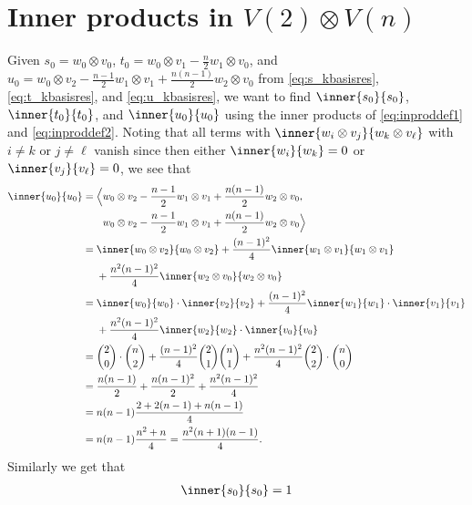 \section{\texorpdfstring{Inner products in $V(2)\otimes V(n)$}{Inner products in V(2) tensor V(n)}}\label{sec:innerproductscalc}

Given $s_0=w_0\otimes v_0$, $t_0=w_0\otimes v_1 - \tfrac{n}{2}w_1\otimes v_0$, and $u_0=w_0\otimes v_2 - \tfrac{n-1}{2}w_1\otimes v_1 + \tfrac{n(n-1)}{2}w_2\otimes v_0$ from \cref{eq:s_kbasisres}, \cref{eq:t_kbasisres}, and \cref{eq:u_kbasisres}, we want to find $\inner{s_0}{s_0}$, $\inner{t_0}{t_0}$, and $\inner{u_0}{u_0}$ using the inner products of \cref{eq:inproddef1} and \cref{eq:inproddef2}. Noting that all terms with $\inner{w_i\otimes v_j}{w_k\otimes v_\ell}$ with $i\neq k$ or $j\neq \ell$ vanish since then either $\inner{w_i}{w_k}=0$ or $\inner{v_j}{v_\ell}=0$, we see that
\begin{align*}
  \inner{u_0}{u_0} &= \Bigl\langle w_0\otimes v_2 - \dfrac{n-1}{2}w_1\otimes v_1 + \dfrac{n(n-1)}{2}w_2\otimes v_0, \\*
                   &\phantom{{}={}\Bigl\langle }{} w_0\otimes v_2 - \dfrac{n-1}{2}w_1\otimes v_1 + \dfrac{n(n-1)}{2}w_2\otimes v_0 \Bigr\rangle \\
                   &= \inner{w_0\otimes v_2}{w_0\otimes v_2} + \dfrac{(n-1)^2}{4}\inner{w_1\otimes v_1}{w_1\otimes v_1} \\*
                   &\phantom{{}={}}{} + \dfrac{n^2(n-1)^2}{4}\inner{w_2\otimes v_0}{w_2\otimes v_0} \\
                   &= \inner{w_0}{w_0}\cdot\inner{v_2}{v_2} + \dfrac{(n-1)^2}{4}\inner{w_1}{w_1}\cdot\inner{v_1}{v_1} \\*
                   &\phantom{{}={}}{} + \dfrac{n^2(n-1)^2}{4}\inner{w_2}{w_2}\cdot\inner{v_0}{v_0} \\
                   &= \binom{2}{0}\cdot\binom{n}{2} + \dfrac{(n-1)^2}{4}\binom{2}{1}\binom{n}{1} + \dfrac{n^2(n-1)^2}{4}\binom{2}{2}\cdot\binom{n}{0} \\
                   &= \dfrac{n(n-1)}{2} + \dfrac{n(n-1)^2}{2} + \dfrac{n^2(n-1)^2}{4} \\
                   &= n(n-1)\dfrac{2+2(n-1)+n(n-1)}{4} \\
                   &= n(n-1)\dfrac{n^2 + n}{4} = \dfrac{n^2(n+1)(n-1)}{4}.
\end{align*}
Similarly we get that
\begin{align*}
  \inner{s_0}{s_0} = 1
\end{align*}

